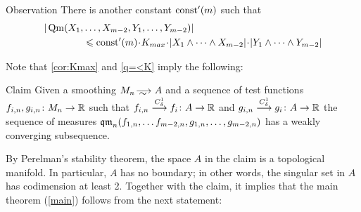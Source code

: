 \begin{thm}{Observation}\label{q=<K}
There is another constant $\mathrm{const}'(m)$ such that 
\begin{align*}
|\Qm(X_1,&\dots,X_{m-2},Y_1,\dots,Y_{m-2})|
\\
&\le 
\const'(m)\cdot K_{max}\cdot|X_1\wedge\dots\wedge X_{m-2}|\cdot |Y_1\wedge\dots\wedge Y_{m-2}|
\end{align*}

\end{thm}

Note that \ref{cor:Kmax} and \ref{q=<K} imply the following:

\begin{thm}{Claim}\label{clm:weak-partial-limit}
Given a smoothing $M_n\smooths{} A$ and a sequence of test functions $f_{i,n},g_{i,n}\colon M_n\to \mathbb{R}$ such that 
$f_{i,n}\stackrel{C^1_\delta}{\longrightarrow} f_i\colon A\to \mathbb{R}$ and $g_{i,n}\stackrel{C^1_\delta}{\longrightarrow} g_i\colon A\to \mathbb{R}$ the sequence of measures 
$\operatorname{\mathfrak{qm}}_n(f_{1,n},\dots f_{m-2,n},g_{1,n},\dots, g_{m-2,n})$ has a weakly converging subsequence.
\end{thm}

{\color{blue}
By Perelman's stability theorem, the space $A$ in the claim is a topological manifold.
In particular, $A$ has no boundary;
in other words, the singular set in $A$ has codimension at least 2.
Together with the claim, it implies that the main theorem (\ref{main}) follows from the next statement:}


